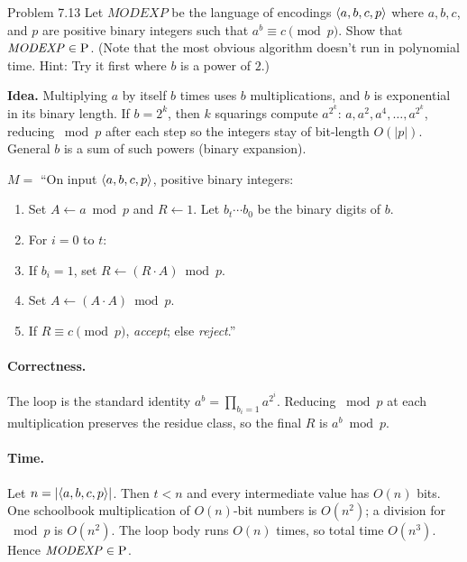 \begin{question}{Problem 7.13}
Let $\mathit{MODEXP}$ be the language of encodings $\langle a,b,c,p\rangle$ where $a,b,c$, and $p$ are positive binary integers such that $a^b\equiv c\pmod{p}$.
Show that $\mathit{MODEXP}\in\mathrm{P}$. (Note that the most obvious algorithm doesn't run in polynomial time. Hint: Try it first where $b$ is a power of $2$.)
\end{question}
\begin{soln}
\textbf{Idea.} Multiplying $a$ by itself $b$ times uses $b$ multiplications, and $b$ is exponential in its binary length. If $b=2^k$, then $k$ squarings compute $a^{2^k}$: $a,a^2,a^4,\dots,a^{2^k}$, reducing $\bmod p$ after each step so the integers stay of bit-length $O(|p|)$. General $b$ is a sum of such powers (binary expansion).

$M=$ ``On input $\langle a,b,c,p\rangle$, positive binary integers:
\begin{enumerate}
\item Set $A\leftarrow a\bmod p$ and $R\leftarrow 1$. Let $b_t\cdots b_0$ be the binary digits of $b$.
\item For $i=0$ to $t$:
\item \quad If $b_i=1$, set $R\leftarrow(R\cdot A)\bmod p$.
\item \quad Set $A\leftarrow(A\cdot A)\bmod p$.
\item If $R\equiv c\pmod{p}$, \emph{accept}; else \emph{reject}.''
\end{enumerate}

\paragraph{Correctness.}
The loop is the standard identity $a^b=\prod_{b_i=1}a^{2^i}$. Reducing $\bmod p$ at each multiplication preserves the residue class, so the final $R$ is $a^b\bmod p$.

\paragraph{Time.}
Let $n=|\langle a,b,c,p\rangle|$. Then $t<n$ and every intermediate value has $O(n)$ bits. One schoolbook multiplication of $O(n)$-bit numbers is $O(n^2)$; a division for $\bmod p$ is $O(n^2)$. The loop body runs $O(n)$ times, so total time $O(n^3)$. Hence $\mathit{MODEXP}\in\mathrm{P}$.
\end{soln}

